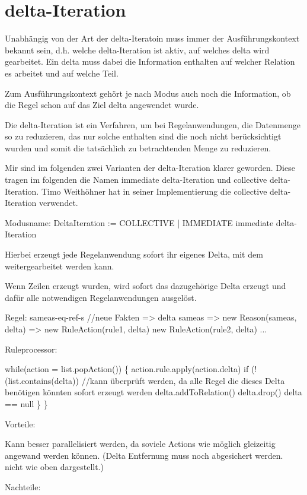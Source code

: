 \section{delta-Iteration}

Unabhängig von der Art der delta-Iteratoin muss immer der Ausführungskontext bekannt sein, d.h. welche delta-Iteration ist aktiv, auf welches delta wird gearbeitet. Ein delta muss dabei die Information enthalten auf welcher Relation es arbeitet und auf welche Teil.

Zum Ausführungskontext gehört je nach Modus auch noch die Information, ob die Regel schon auf das Ziel delta angewendet wurde.



Die delta-Iteration ist ein Verfahren, um bei Regelanwendungen, die Datenmenge so zu reduzieren, das nur solche enthalten sind die noch nicht berücksichtigt wurden und somit die tatsächlich zu betrachtenden Menge zu reduzieren.

Mir sind im folgenden zwei Varianten der delta-Iteration klarer geworden. Diese tragen im folgenden die Namen immediate delta-Iteration und collective delta-Iteration. Timo Weithöhner hat in seiner Implementierung die collective delta-Iteration verwendet.

Modusname: DeltaIteration := COLLECTIVE | IMMEDIATE
immediate delta-Iteration

Hierbei erzeugt jede Regelanwendung sofort ihr eigenes Delta, mit dem weitergearbeitet werden kann.

Wenn Zeilen erzeugt wurden, wird sofort das dazugehörige Delta erzeugt und dafür alle notwendigen Regelanwendungen ausgelöst.

Regel: sameas-eq-ref-s //neue Fakten
=> delta sameas
   => new Reason(sameas, delta)
      => new RuleAction(rule1, delta)
         new RuleAction(rule2, delta)
         ...

Ruleprocessor:

while(action = list.popAction()) \{
  action.rule.apply(action.delta)
  if (!(list.contains(delta)) //kann überprüft werden, da alle Regel die dieses Delta benötigen könnten sofort erzeugt werden
    delta.addToRelation()
    delta.drop()
    delta == null
  \}
\}

Vorteile:

Kann besser parallelisiert werden, da soviele Actions wie möglich gleizeitig angewand werden können. (Delta Entfernung muss noch abgesichert werden. nicht wie oben dargestellt.)

Nachteile:


